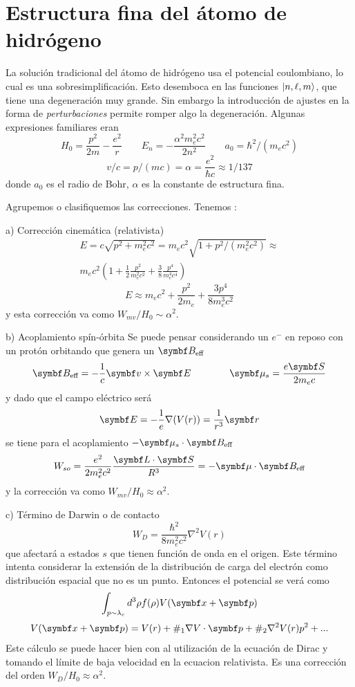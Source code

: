 \documentclass[10pt,oneside]{CBFT_book}
\begin{document}
\section{Estructura fina del átomo de hidrógeno}

La solución tradicional del átomo de hidrógeno usa el potencial coulombiano, lo cual es una
sobresimplificación. 
Esto desemboca en las funciones $\Ket{n,\ell,m}$, que tiene una degeneración muy grande.
Sin embargo la introducción de ajustes en la forma de {\it perturbaciones} permite romper algo 
la degeneración.
Algunas expresiones familiares eran
\[
	H_0=\frac{p^2}{2m} - \frac{e^2}{r} \qquad E_n = -\frac{\alpha^2m_e^2c^2}{2n^2} \qquad 
	a_0 = \hbar^2/(m_ec^2)
\]
\[
	v/c = p/(mc) = \alpha = \frac{e^2}{\hbar c} \approx 1/137
\]
donde $a_0$ es el radio de Bohr, $\alpha$ es la constante de estructura fina.

Agrupemos o clasifiquemos las correcciones. Tenemos :

a) Corrección cinemática (relativista)
\begin{multline*}
	E = c \sqrt{p^2 + m_e^2c^2} = m_ec^2\sqrt{1 + p^2/(m_e^2c^2)} \approx \\
	m_ec^2 \left( 1 + \frac{1}{2}\frac{p^2}{m_e^2c^2} + \frac{3}{8}\frac{p^4}{m_e^4c^4} \right) 
\end{multline*}
\[
	E \approx m_ec^2 + \frac{p^2}{2m_e} + \frac{3p^4}{8m_e^3c^2}
\]
y esta corrección va como $W_{mv}/H_0 \sim \alpha^2$.

b) Acoplamiento spín-órbita
Se puede pensar considerando un $e^-$ en reposo con un protón orbitando que genera un $\vb{B}_\text{eff}$
\[
	\vb{B}_\text{eff} = - \frac{1}{c} \pv{v}{E} \qquad \qquad 
	\vb{\mu}_s = \frac{e\vb S}{2 m_e c}
\]
y dado que el campo eléctrico será
\[
	\vb E = - \frac{1}{e} \nabla( V(r) ) = \frac{1}{r^3} \vb r
\]
se tiene para el acoplamiento $-\vb{\mu}_s \cdot \vb{B}_\text{eff} $
\[
	W_{so} = \frac{e^2}{2m_e^2c^2} \frac{\vb{L}\cdot\vb{S}}{R^3} = -\vb{\mu}\cdot\vb{B}_\text{eff}
\]
y la corrección va como $W_{mv}/H_0 \approx \alpha^2$.

c) Término de Darwin o de contacto
\[
	W_D = \frac{\hbar^2}{8m_e^2c^2} \nabla^2 V(r)
\]
que afectará a estados $s$ que tienen función de onda en el origen. Este término intenta considerar la
extensión de la distribución de carga del electrón como distribución espacial que no es un punto.
Entonces el potencial se verá como
\[
	\int_{p \sim \lambda_c } d^3\rho f(\rho) V(\vbx + \vb{p} )
\]
\[
	V(\vbx + \vb{p} ) = V(r) + \#_1 \nabla V \cdot \vb p + \#_2 \nabla^2 V(r) p^2 + ...
\]
Este cálculo se puede hacer bien con al utilización de la ecuación de Dirac y tomando el límite de baja
velocidad en la ecuacion relativista.
Es una corrección del orden $W_{D}/H_0 \approx \alpha^2$.
\end{document}
